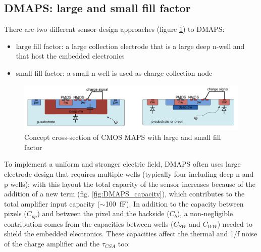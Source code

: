    \subsection{DMAPS: large and small fill factor}\label{sec:small-large-fill-factor}
      There are two different sensor-design approaches (figure \ref{fig:large_small_sensor_scheme})
      to DMAPS:
      \begin{itemize}
         \item large fill factor: a large collection electrode that is a large deep n-well
      and that host the embedded electronics
         \item small fill factor: a small n-well is used as charge collection node
      \end{itemize}
      \begin{figure}
         \centering\includegraphics[width=15cm]{figures/Pixel_detectors/large_small_sensor_scheme.png}
         \caption{Concept cross-section of CMOS MAPS with large and small fill factor}
         \label{fig:large_small_sensor_scheme}
      \end{figure}
      To implement a uniform and stronger electric field, DMAPS often uses large electrode design that requires multiple wells (typically four including deep n and p wells); with this layout the total capacity of the sensor increases because of the addition of a new term (fig. \ref{fig:DMAPS_capacity}), which contributes to the total amplifier input capacity ($\sim$\SI{100}{fF}). In addition to the capacity between pixels ($C_{pp}$) and between the pixel and the backside ($C_{b}$), a non-negligible contribution comes from the capacities between wells ($C_{SW}$ and $C_{WW}$) needed to shield the embedded electronics. These capacities affect the thermal and 1/f noise of the charge amplifier and the $ \tau_{CSA}$ too:

